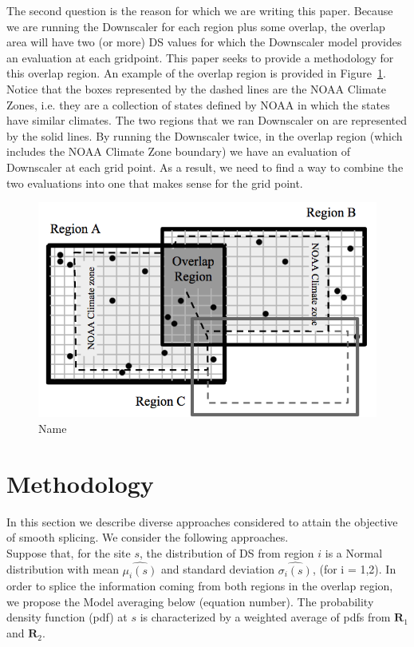 \documentclass[10pt]{article}
\begin{document}
\justify
The second question is the reason for which we are writing this paper.  Because we are running the Downscaler for each region plus some overlap, the overlap area will have two (or more) DS values for which the Downscaler model provides an evaluation at each gridpoint.  This paper seeks to provide a methodology for this overlap region.  An example of the overlap region is provided in Figure~\ref{fig:overlap}.  Notice that the boxes represented by the dashed lines are the NOAA Climate Zones, i.e. they are a collection of states defined by NOAA in which the states have similar climates.  The two regions that we ran Downscaler on are represented by the solid lines.  By running the Downscaler twice, in the overlap region (which includes the NOAA Climate Zone boundary) we have an evaluation of Downscaler at each grid point.  As a result, we need to find a way to combine the two evaluations into one that makes sense for the grid point.

\begin{figure}
	\centering
	\vspace{-1em}
	\includegraphics[width=0.7\linewidth]{overlap}
	\caption{Name}
	\label{fig:overlap}
\end{figure}


\section{Methodology}
In this section we describe diverse approaches considered to attain the objective of smooth splicing. We consider the following approaches.\\
Suppose that, for the site $s$, the distribution of DS from region $i$ is a Normal distribution with mean $\hat{\mu_{i}(s)}$ and standard deviation $\hat{\sigma_{i}(s)}$, (for i = 1,2).
\justify
In order to splice the information coming from both regions in the overlap region, we propose the Model averaging below (equation number). The probability density function (pdf) at $s$ is characterized by a weighted average of pdfs from $\bm{R}_{1}$ and $\bm{R}_{2}$. 
\end{document}
